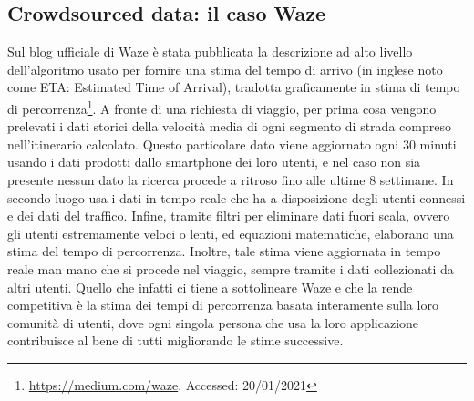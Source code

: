 \subsection{Crowdsourced data: il caso Waze}

Sul blog ufficiale di Waze è stata pubblicata la descrizione ad alto livello dell'algoritmo usato per fornire una stima del tempo di arrivo (in inglese noto come ETA: Estimated Time of Arrival), tradotta graficamente in stima di tempo di percorrenza\footnote{\url{https://medium.com/waze}. Accessed: 20/01/2021}. A fronte di una richiesta di viaggio, per prima cosa vengono prelevati i dati storici della velocità media di ogni segmento di strada compreso nell'itinerario calcolato. Questo particolare dato viene aggiornato ogni 30 minuti usando i dati prodotti dallo smartphone dei loro utenti, e nel caso non sia presente nessun dato la ricerca procede a ritroso fino alle ultime 8 settimane. In secondo luogo usa i dati in tempo reale che ha a disposizione degli utenti connessi e dei dati del traffico. Infine, tramite filtri per eliminare dati fuori scala, ovvero gli utenti estremamente veloci o lenti, ed equazioni matematiche, elaborano una stima del tempo di percorrenza. Inoltre, tale stima viene aggiornata in tempo reale man mano che si procede nel viaggio, sempre tramite i dati collezionati da altri utenti. Quello che infatti ci tiene a sottolineare Waze e che la rende competitiva è la stima dei tempi di percorrenza basata interamente sulla loro comunità di utenti, dove ogni singola persona che usa la loro applicazione contribuisce al bene di tutti migliorando le stime successive.

























